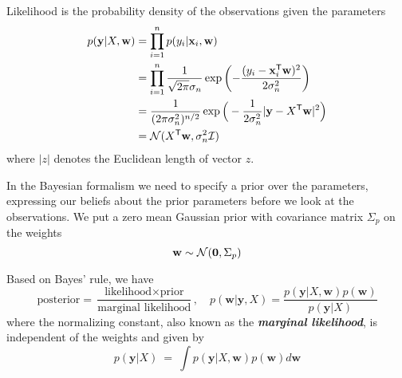 \documentclass[10pt]{elegantbook}
\newcommand{\mydefination}[1]{\textbf{\textit{\textcolor{structurecolor}{#1}}}}
\begin{document}
\begin{definition}[Likelihood]
    Likelihood is the probability density of the observations given the parameters
    \begin{equation}
        \begin{aligned}
            p(\mathbf{y}|X,\mathbf{w}) &= \prod_{i=1}^{n}p(y_{i}|\mathbf{x}_{i},\mathbf{w}) \\
            &= \prod_{i=1}^{n}\frac{1}{\sqrt{2\pi}\sigma_{n}}\exp\left(-\frac{(y_{i}-\mathbf{x}_{i}^{\mathsf{T}}\mathbf{w})^{2}}{2\sigma_{n}^{2}}\right) \\
            &= \frac{1}{(2\pi\sigma_{n}^{2})^{n/2}}\exp\Big(-\frac{1}{2\sigma_{n}^{2}}|{\bf y}-X^{\mathsf{T}}{\bf w}|^{2}\Big) \\
            &= {\cal N}(X^{\mathsf{T}}{\bf w},\sigma_{n}^{2}{\cal I})
        \end{aligned}
    \end{equation}
    where $|z|$ denotes the Euclidean length of vector $z$.
\end{definition}

In the Bayesian formalism
we need to specify a prior over the parameters, expressing our beliefs about the prior
parameters before we look at the observations. We put a zero mean Gaussian
prior with covariance matrix $\Sigma_p$ on the weights
\begin{equation}
    {\bf w}\sim{\mathcal N}({\bf0},\Sigma_{p})
\end{equation}

\begin{definition}[Posterior]
    Based on Bayes' rule, we have
    \begin{equation}
        \text{posterior} = \frac{\text{likelihood} \times \text{prior}}{\text{marginal likelihood}}, \quad 
        p(\mathbf{w}|\mathbf{y},X) = {\frac{p(\mathbf{y}|X,\mathbf{w})p(\mathbf{w})}{p(\mathbf{y}|X)}}
    \end{equation}
    where the normalizing constant, also known as the \mydefination{marginal likelihood}, is independent of the weights and given by
    \begin{equation}
        p(\mathbf{y}|X)\ =\ \int p(\mathbf{y}|X,\mathbf{w})p(\mathbf{w})d\mathbf{w}
    \end{equation}
\end{definition}
\end{document}
